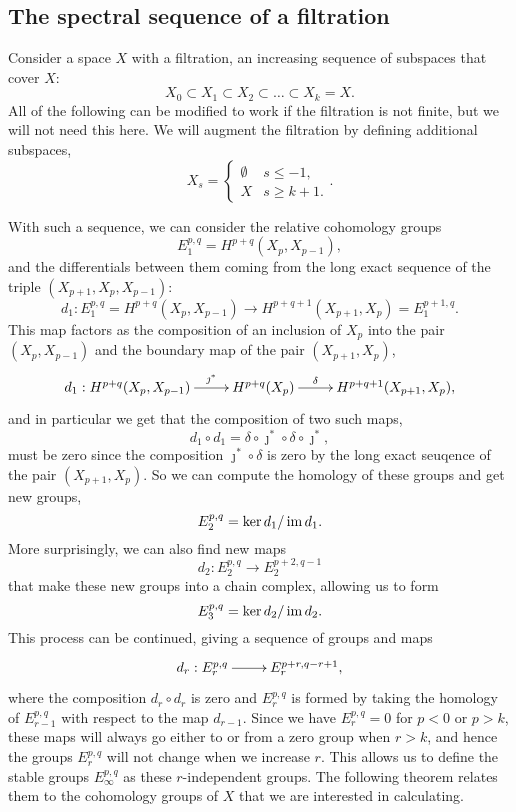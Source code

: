 \subsection{The spectral sequence of a filtration}
\label{sec:ss-filtration}

Consider a space $X$ with a filtration, an increasing sequence
of subspaces that cover $X$:
\[ X_0 \subset X_1 \subset X_2 \subset
\dots \subset X_k  = X. \]
All of the following can be modified to work if the filtration is not
finite, but we will not need this here. We will augment the filtration
by defining additional subspaces,
\[ X_s =
\begin{cases}
  \emptyset & s \leq -1, \\
  X & s \geq k+1.
\end{cases}. \]

With such a sequence, we can
consider the relative cohomology groups
\[ E_1^{p,q} = H^{p+q}(X_p,X_{p-1}), \]
and the differentials between them coming from the long exact sequence
of the triple $(X_{p+1},X_p,X_{p-1})$:
\[ d_1 : E_1^{p,q} = H^{p+q}(X_p,X_{p-1}) \to H^{p+q+1}(X_{p+1},X_p) =
E_1^{p+1,q}. \]
This map factors as the composition of an
inclusion of $X_p$ into the pair $(X_p,X_{p-1})$ and the boundary map
of the pair
$(X_{p+1},X_p)$,
\[ \xymatrix{ d_1 : H^{p+q}(X_p,X_{p-1}) \ar[r]^<<<<<{\jmath^*} &
  H^{p+q}(X_p) \ar[r]^<<<<<{\delta} & H^{p+q+1}(X_{p+1},X_p),
} \]
and in particular we get that the composition of two such maps,
\[ d_1 \circ d_1 = \delta \circ \jmath^* \circ \delta \circ
\jmath^*, \]
must be
zero since the composition $\jmath^*\circ\delta$ is zero by the
long exact seuqence of the pair $(X_{p+1},X_p)$. So we can compute the
homology of these groups and get new groups,
\[ E_2^{p,q} = \ker d_1 / \operatorname{im} d_1. \]
More surprisingly, we can also find new maps
\[ d_2 : E_2^{p,q} \to E_2^{p+2,q-1} \]
that make these new groups into a chain complex, allowing us to form
\[ E_3^{p,q} = \ker d_2 / \operatorname{im} d_2. \]
This process can be continued, giving a sequence of groups and maps
\[ \xymatrix{d_r : E_r^{p,q} \ar[r] & E_r^{p+r,q-r+1}, } \]
where the composition $d_r \circ d_r$ is zero and
$E_r^{p,q}$ is formed by taking the homology of $E_{r-1}^{p,q}$ with
respect to the map $d_{r-1}$. Since we have $E_r^{p,q} = 0$ for $p <
0$ or $p > k$, these maps will always go either to or from
a zero
group when $r > k$, and hence the groups $E_r^{p,q}$ will not change
when we
increase $r$. This allows us to
define the stable groups $E_\infty^{p,q}$ as these $r$-independent
groups. The following theorem relates them to the cohomology groups of
$X$ that we are interested in calculating.

